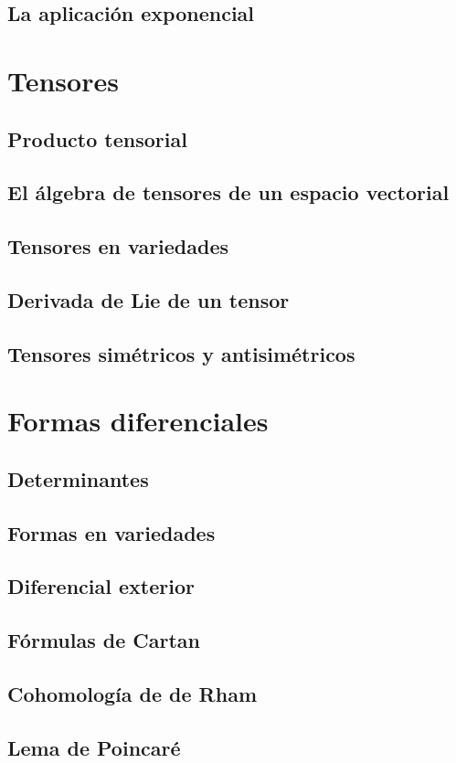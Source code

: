 \documentclass[12pt,a4paper]{book}
\theoremstyle{definition} \newtheorem{defn}[thm]{Definición}
\theoremstyle{definition} \newtheorem{ejemplo}[thm]{Ejemplo}
\theoremstyle{definition} \newtheorem{ejercicio}[thm]{Ejercicio}
\theoremstyle{remark} \newtheorem*{obs}{Observación}
\begin{document}
	  \section{La aplicación exponencial}
	  \chapter{Tensores}
	  \section{Producto tensorial}
	  \section{El álgebra de tensores de un espacio vectorial}
	  \section{Tensores en variedades}
	  \section{Derivada de Lie de un tensor}
	  \section{Tensores simétricos y antisimétricos}
	  \chapter{Formas diferenciales}
	  \section{Determinantes}
	  \section{Formas en variedades}
	  \section{Diferencial exterior}
	  \section{Fórmulas de Cartan}
	  \section{Cohomología de de Rham}
	  \section{Lema de Poincaré}
\end{document}
